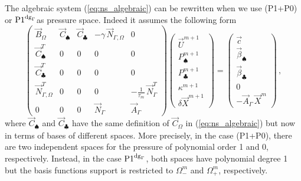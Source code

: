 \documentclass[a4paper,12pt,onecolumn]{article}
\newcommand{\NbulkT}{\vec{N}_{\Gamma,\Omega}^T}
\newcommand{\Nbulk}{\vec{N}_{\Gamma,\Omega}}
\newcommand{\pdg}{${\rm P1}^{{\rm dg}_\Gamma}$} %
\begin{document}
The algebraic system (\ref{eq:ns_algebraic}) can be rewritten when we
use (P1+P0) or \pdg as pressure space. Indeed it assumes the following form
\begin{equation}
\begin{pmatrix}
\vec B_\Omega & \vec C_{\spadesuit} & \vec C_{\clubsuit} & -\gamma\,\Nbulk & 0\\
\vec C^T_{\spadesuit} & 0 & 0 & 0 & 0 \\
\vec C^T_{\clubsuit} & 0 & 0 & 0 & 0 \\
\NbulkT & 0 & 0 & 0 & -\frac1{\tau_m}\,\vec N_\Gamma^T \\
0 & 0 & 0 & \vec N_\Gamma & \vec A_\Gamma
\end{pmatrix}
\begin{pmatrix}
\vec U^{m+1} \\
P^{m+1}_\spadesuit \\
P^{m+1}_\clubsuit \\
\kappa^{m+1} \\
\delta\vec X^{m+1}
\end{pmatrix}
=
\begin{pmatrix}
\vec c \\
\vec \beta_\spadesuit \\
\vec \beta_\clubsuit \\
0 \\
-\vec A_\Gamma\,\vec X^m
\end{pmatrix} \,,
\label{eq:ns_algebraic_extended}
\end{equation}
where $\vec C_{\spadesuit}$ and $\vec C_{\clubsuit}$ have the same definition
of $\vec C_\Omega$ in (\ref{eq:ns_algebraic}) but now in terms of bases of
different spaces. More precisely, in the case (P1+P0), there are two
independent spaces for the pressure of polynomial order 1 and 0, respectively.
Instead, in the case \pdg, both spaces have polynomial degree 1 but the basis
functions support is restricted to $\Omega_-^m$ and $\Omega_+^m$, respectively.
\end{document}

